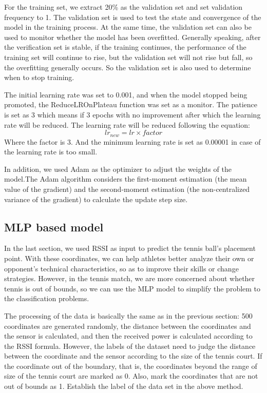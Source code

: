 For the training set, we extract 20\% as the validation set and set validation frequency to 1. The validation set is used to test the state and convergence of the model in the training process. At the same time, the validation set can also be used to monitor whether the model has been overfitted. Generally speaking, after the verification set is stable, if the training continues, the performance of the training set will continue to rise, but the validation set will not rise but fall, so the overfitting generally occurs. So the validation set is also used to determine when to stop training.

The initial learning rate was set to 0.001, and when the model stopped being promoted, the ReduceLROnPlateau function was set as a monitor. The patience is set as 3 which means if 3 epochs with no improvement after which the learning rate will be reduced. The learning rate will be reduced following the equation: 
\begin{equation}
lr_{new} = lr \times factor    
\end{equation}
Where the factor is 3. And the minimum learning rate is set as 0.00001 in case of the learning rate is too small.

In addition, we used Adam \cite{kingma2014adam} as the optimizer to adjust the weights of the model.The Adam algorithm considers the first-moment estimation (the mean value of the gradient) and the second-moment estimation (the non-centralized variance of the gradient) to calculate the update step size.


\subsection{MLP based model}
In the last section, we used RSSI as input to predict the tennis ball's placement point. With these coordinates, we can help athletes better analyze their own or opponent's technical characteristics, so as to improve their skills or change strategies. However, in the tennis match, we are more concerned about whether tennis is out of bounds, so we can use the MLP model to simplify the problem to the classification problems.

The processing of the data is basically the same as in the previous section: 500 coordinates are generated randomly, the distance between the coordinates and the sensor is calculated, and then the received power is calculated according to the RSSI formula. However, the labels of the dataset need to judge the distance between the coordinate and the sensor according to the size of the tennis court. If the coordinate out of the boundary, that is, the coordinates beyond the range of size of the tennis court are marked as 0. Also, mark the coordinates that are not out of bounds as 1. Establish the label of the data set in the above method.

